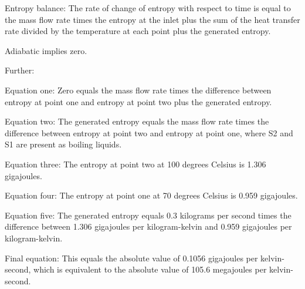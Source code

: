 Entropy balance:
The rate of change of entropy with respect to time is equal to the mass flow rate times the entropy at the inlet plus the sum of the heat transfer rate divided by the temperature at each point plus the generated entropy.

Adiabatic implies zero.

Further:

Equation one:
Zero equals the mass flow rate times the difference between entropy at point one and entropy at point two plus the generated entropy.

Equation two:
The generated entropy equals the mass flow rate times the difference between entropy at point two and entropy at point one, where S2 and S1 are present as boiling liquids.

Equation three:
The entropy at point two at 100 degrees Celsius is 1.306 gigajoules.

Equation four:
The entropy at point one at 70 degrees Celsius is 0.959 gigajoules.

Equation five:
The generated entropy equals 0.3 kilograms per second times the difference between 1.306 gigajoules per kilogram-kelvin and 0.959 gigajoules per kilogram-kelvin.

Final equation:
This equals the absolute value of 0.1056 gigajoules per kelvin-second, which is equivalent to the absolute value of 105.6 megajoules per kelvin-second.